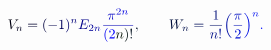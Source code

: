 \documentclass[12pt]{article}
\begin{document}
\makeatletter
\renewcommand*{\@textcolor}[3]{%
  \protect\leavevmode
  \begingroup
    \color#1{#2}#3%
  \endgroup
}
\makeatother
\begin{displaymath}
\mathcolor[RGB]{0,0,15}{V} _ { \mathcolor[RGB]{0,0,30}{n} } \mathcolor[RGB]{0,0,45}{=} \mathcolor[RGB]{0,0,60}{(} \mathcolor[RGB]{0,0,75}{-} \mathcolor[RGB]{0,0,90}{1} \mathcolor[RGB]{0,0,105}{)} ^ { \mathcolor[RGB]{0,0,120}{n} } \mathcolor[RGB]{0,0,135}{E} _ { \mathcolor[RGB]{0,0,150}{2} \mathcolor[RGB]{0,0,165}{n} } \mathcolor[RGB]{0,0,180}{\frac { \mathcolor[RGB]{0,0,195}{\pi} ^ { \mathcolor[RGB]{0,0,210}{2} \mathcolor[RGB]{0,0,225}{n} } } { \mathcolor[RGB]{0,0,240}{(} \mathcolor[RGB]{0,0,255}{2} \mathcolor[RGB]{0,15,0}{n} \mathcolor[RGB]{0,15,15}{)} \mathcolor[RGB]{0,15,30}{!} } } \mathcolor[RGB]{0,15,45}{,} \mathcolor[RGB]{0,15,60}{\qquad
W} _ { \mathcolor[RGB]{0,15,75}{n} } \mathcolor[RGB]{0,15,90}{=} \mathcolor[RGB]{0,15,105}{\frac { \mathcolor[RGB]{0,15,120}{1} } { \mathcolor[RGB]{0,15,135}{n} \mathcolor[RGB]{0,15,150}{!} } } \mathcolor[RGB]{0,15,165}{\Bigl(} \mathcolor[RGB]{0,15,180}{\frac { \mathcolor[RGB]{0,15,195}{\pi} } { \mathcolor[RGB]{0,15,210}{2} } } \mathcolor[RGB]{0,15,225}{\Bigr)} ^ { \mathcolor[RGB]{0,15,240}{n} } \mathcolor[RGB]{0,15,255}{.}
\end{displaymath}
\end{document}
